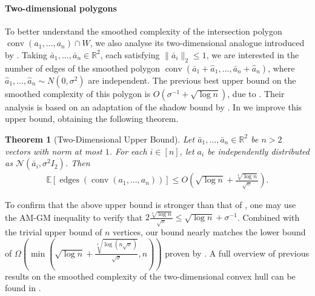 \documentclass{article}\usepackage[a4paper,margin=20mm]{geometry}
\newtheorem{theorem}{Theorem}\newtheorem{lemma}[theorem]{Lemma}\newtheorem{proposition}[theorem]{Proposition}\newtheorem{corollary}[theorem]{Corollary}\newtheorem{definition}[theorem]{Definition}\newtheorem{claim}[theorem]{Claim}\newtheorem{remark}[theorem]{Remark}\newtheorem{observation}[theorem]{Observation}\newtheorem{conjecture}[theorem]{Conjecture}\newtheorem{example}[theorem]{Example}
\newcommand{\R}{\mathbb R}
\newcommand{\E}{\mathbb E}
\newcommand{\conv}{\operatorname{conv}}
\newcommand{\edges}{\operatorname{edges}}
\begin{document}
\paragraph{Two-dimensional polygons}
To better understand the smoothed complexity of the intersection polygon $\conv(a_1,\dots,a_n)\cap W$,
we also analyse its two-dimensional analogue introduced by \cite{damerow2004extreme}.
Taking $\bar a_1,\dots,\bar a_n \in \R^2$, each satisfying $\|\bar{a}_i\|_2\leq 1$,
we are interested in the number of edges of the smoothed polygon
$\conv(\bar a_1 + \hat a_1,\dots,\bar a_n + \hat a_n)$,
where $\hat a_1,\dots,\hat a_n \sim N(0,\sigma^2)$ are independent.
The previous best upper bound on the smoothed complexity of this polygon
is $O(\sigma^{-1} + \sqrt{\log n})$, due to \cite{bwcachapter}.
Their analysis is based on an adaptation of the shadow bound by \cite{DH18}.
In  we improve this upper bound, obtaining the following theorem.
\begin{theorem}[Two-Dimensional Upper Bound]\label{thm:twod-intro}
    Let $\bar{a}_1, \ldots, \bar{a}_n \in \R^2$ be $n > 2$ vectors with norm at
    most $1$. For each $i \in [n]$, let $a_i$ be independently distributed as
    $\mathcal{N}(\bar{a}_i, \sigma^2 I_{2})$. Then
    \begin{align*}
        \E\left[ \edges\left(\conv(a_1, \ldots, a_n) \right) \right] \leq O\left(\sqrt{\log n} + \frac{\sqrt[4]{\log n}}{\sqrt{\sigma}}\right).
    \end{align*}
\end{theorem}
To confirm that the above upper bound is stronger than that of \cite{bwcachapter}, one may
use the AM-GM inequality to verify that $2\frac{\sqrt[4]{\log n}}{\sqrt{\sigma}} \leq \sqrt{\log n} + \sigma^{-1}$.
Combined with the trivial upper bound of $n$ vertices, our bound nearly matches the lower bound of
$\Omega(\min(\sqrt{\log n} + \frac{\sqrt[4]{\log (n\sqrt\sigma)}}{\sqrt\sigma}, n))$ proven by \cite{DGGT16}.  
A full overview of previous results on the smoothed complexity of the two-dimensional convex hull
can be found in .
\end{document}
